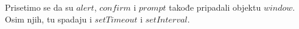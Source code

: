 Prisetimo se da su $alert$, $confirm$ i $prompt$ takođe pripadali objektu $window$. Osim njih, tu spadaju i $setTimeout$ i $setInterval$.






